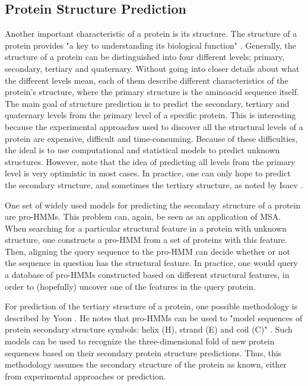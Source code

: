 \documentclass{article}\usepackage[]{graphicx}\usepackage[]{color}
\begin{document}
\subsection{Protein Structure Prediction}\label{Section:ProtStructurePred}
Another important characteristic of a protein is its structure. The structure of a protein provides "a key to understanding its biological function" \cite{Isaev2006}. Generally, the structure of a protein can be distinguished into four different levels; primary, secondary, tertiary and quaternary. Without going into closer details about what the different levels mean, each of them describe different characteristics of the protein's structure, where the primary structure is the aminoacid sequence itself. The main goal of structure prediction is to predict the secondary, tertiary and quaternary levels from the primary level of a specific protein. This is interesting because the experimental approaches used to discover all the structural levels of a protein are expensive, difficult and time-consuming. Because of these difficulties, the ideal is to use computational and statistical models to predict unknown structures. However, note that the idea of predicting all levels from the primary level is very optimistic in most cases. In practice, one can only hope to predict the secondary structure, and sometimes the tertiary structure, as noted by Isaev \cite{Isaev2006}.

One set of widely used models for predicting the secondary structure of a protein are pro-HMMs. This problem can, again, be seen as an application of MSA. When searching for a particular structural feature in a protein with unknown structure, one constructs a pro-HMM from a set of proteins with this feature. Then, aligning the query sequence to the pro-HMM can decide whether or not the sequence in question has the structural feature. In practice, one would query a database of pro-HMMs constructed based on different structural features, in order to (hopefully) uncover one of the features in the query protein.  

For prediction of the tertiary structure of a protein, one possible methodology is described by Yoon \cite{Yoon2009}. He notes that pro-HMMs can be used to "model sequences of protein secondary structure symbols: helix (H), strand (E) and coil (C)" \cite{Yoon2009}. Such models can be used to recognize the three-dimensional fold of new protein sequences based on their secondary protein structure predictions. Thus, this methodology assumes the secondary structure of the protein as known, either from experimental approaches or prediction. 
\end{document}
